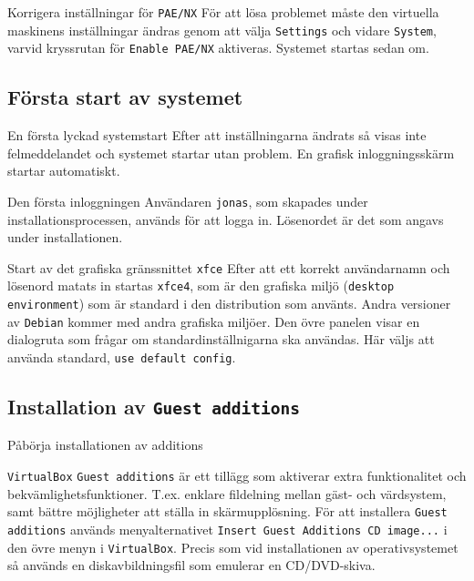 {
           {Korrigera inställningar för \texttt{PAE/NX}}
           {För att lösa problemet måste den virtuella maskinens inställningar
            ändras genom att välja \texttt{Settings} och vidare \texttt{System},
            varvid kryssrutan för \texttt{Enable PAE/NX} aktiveras.
            Systemet startas sedan om.}
           {}


\subsection{Första start av systemet}

           {En första lyckad systemstart}
           {Efter att inställningarna ändrats så visas inte felmeddelandet och
            systemet startar utan problem. En grafisk inloggningsskärm startar
            automatiskt.}
           {}

           {Den första inloggningen}
           {Användaren \texttt{jonas}, som skapades under
            installationsprocessen, används för att logga in.  Lösenordet är
            det som angavs under installationen.}
           {}

           {Start av det grafiska gränssnittet \texttt{xfce}}
           {Efter att ett korrekt användarnamn och lösenord matats in startas
            \texttt{xfce4}, som är den grafiska miljö
            (\texttt{desktop environment}) som är standard i den distribution
            som använts. Andra versioner av \texttt{Debian} kommer med andra
            grafiska miljöer. Den övre panelen visar en dialogruta som frågar
            om standardinställnigarna ska användas. Här väljs att använda
            standard, \texttt{use default config}.}
           {}


\subsection{Installation av \texttt{Guest additions}}

           {Påbörja installationen av \Guest additions}}
           {\texttt{VirtualBox} \texttt{Guest additions} är ett tillägg som
            aktiverar extra funktionalitet och bekvämlighetsfunktioner. T.ex.
            enklare fildelning mellan gäst- och värdsystem, samt bättre
            möjligheter att ställa in skärmupplösning. För att installera
            \texttt{Guest additions} används menyalternativet
            \texttt{Insert Guest Additions CD image...} i den övre menyn i
            \texttt{VirtualBox}. Precis som vid installationen av operativsystemet
            så används en diskavbildningsfil som emulerar en CD/DVD-skiva.}
           {}

